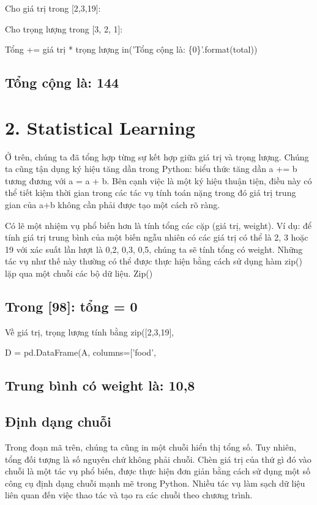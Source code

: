 Cho giá trị trong [2,3,19]:

Cho trọng lượng trong [3, 2, 1]:

Tổng += giá trị * trọng lượng in('Tổng cộng là: \{0\}'.format(total))

\subsection{Tổng cộng là: 144}

\section{2. Statistical Learning}

Ở trên, chúng ta đã tổng hợp từng sự kết hợp giữa giá trị và trọng lượng. Chúng ta cũng tận dụng ký hiệu tăng dần trong Python: biểu thức tăng dần a += b tương đương với a = a + b. Bên cạnh việc là một ký hiệu thuận tiện, điều này có thể tiết kiệm thời gian trong các tác vụ tính toán nặng trong đó giá trị trung gian của a+b không cần phải được tạo một cách rõ ràng.

Có lẽ một nhiệm vụ phổ biến hơn là tính tổng các cặp (giá trị, weight). Ví dụ: để tính giá trị trung bình của một biến ngẫu nhiên có các giá trị có thể là 2, 3 hoặc 19 với xác suất lần lượt là 0,2, 0,3, 0,5, chúng ta sẽ tính tổng có weight. Những tác vụ như thế này thường có thể được thực hiện bằng cách sử dụng hàm zip() lặp qua một chuỗi các bộ dữ liệu. Zip()

\subsection{Trong [98]: tổng = 0}

Về giá trị, trọng lượng tính bằng zip([2,3,19],

D = pd.DataFrame(A, columns=['food',

\subsection{Trung bình có weight là: 10,8}

\subsection{Định dạng chuỗi}

Trong đoạn mã trên, chúng ta cũng in một chuỗi hiển thị tổng số. Tuy nhiên, tổng đối tượng là số nguyên chứ không phải chuỗi. Chèn giá trị của thứ gì đó vào chuỗi là một tác vụ phổ biến, được thực hiện đơn giản bằng cách sử dụng một số công cụ định dạng chuỗi mạnh mẽ trong Python. Nhiều tác vụ làm sạch dữ liệu liên quan đến việc thao tác và tạo ra các chuỗi theo chương trình.

